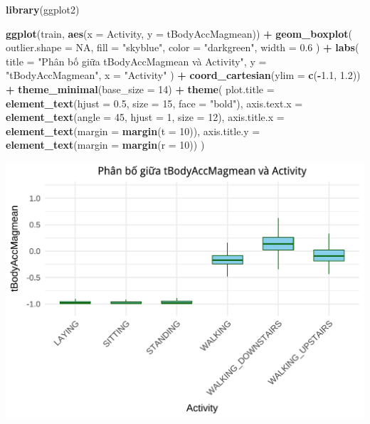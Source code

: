 \documentclass[
]{article}
\newenvironment{Shaded}{\begin{snugshade}}{\end{snugshade}}
\newcommand{\AttributeTok}[1]{\textcolor[rgb]{0.13,0.29,0.53}{#1}}
\newcommand{\ConstantTok}[1]{\textcolor[rgb]{0.56,0.35,0.01}{#1}}
\newcommand{\DecValTok}[1]{\textcolor[rgb]{0.00,0.00,0.81}{#1}}
\newcommand{\FloatTok}[1]{\textcolor[rgb]{0.00,0.00,0.81}{#1}}
\newcommand{\FunctionTok}[1]{\textcolor[rgb]{0.13,0.29,0.53}{\textbf{#1}}}
\newcommand{\NormalTok}[1]{#1}
\newcommand{\SpecialCharTok}[1]{\textcolor[rgb]{0.81,0.36,0.00}{\textbf{#1}}}
\newcommand{\StringTok}[1]{\textcolor[rgb]{0.31,0.60,0.02}{#1}}
\begin{document}
\begin{Shaded}
\begin{Highlighting}[]
\FunctionTok{library}\NormalTok{(ggplot2)}

\FunctionTok{ggplot}\NormalTok{(train, }\FunctionTok{aes}\NormalTok{(}\AttributeTok{x =}\NormalTok{ Activity, }\AttributeTok{y =}\NormalTok{ tBodyAccMagmean)) }\SpecialCharTok{+}
  \FunctionTok{geom\_boxplot}\NormalTok{(}
    \AttributeTok{outlier.shape =} \ConstantTok{NA}\NormalTok{,}
    \AttributeTok{fill =} \StringTok{"skyblue"}\NormalTok{,}
    \AttributeTok{color =} \StringTok{"darkgreen"}\NormalTok{,}
    \AttributeTok{width =} \FloatTok{0.6}
\NormalTok{  ) }\SpecialCharTok{+}
  \FunctionTok{labs}\NormalTok{(}
    \AttributeTok{title =} \StringTok{"Phân bố giữa tBodyAccMagmean và Activity"}\NormalTok{,}
    \AttributeTok{y =} \StringTok{"tBodyAccMagmean"}\NormalTok{,}
    \AttributeTok{x =} \StringTok{"Activity"}
\NormalTok{  ) }\SpecialCharTok{+}
  \FunctionTok{coord\_cartesian}\NormalTok{(}\AttributeTok{ylim =} \FunctionTok{c}\NormalTok{(}\SpecialCharTok{{-}}\FloatTok{1.1}\NormalTok{, }\FloatTok{1.2}\NormalTok{)) }\SpecialCharTok{+} 
  \FunctionTok{theme\_minimal}\NormalTok{(}\AttributeTok{base\_size =} \DecValTok{14}\NormalTok{) }\SpecialCharTok{+}
  \FunctionTok{theme}\NormalTok{(}
    \AttributeTok{plot.title =} \FunctionTok{element\_text}\NormalTok{(}\AttributeTok{hjust =} \FloatTok{0.5}\NormalTok{, }\AttributeTok{size =} \DecValTok{15}\NormalTok{, }\AttributeTok{face =} \StringTok{"bold"}\NormalTok{),}
    \AttributeTok{axis.text.x =} \FunctionTok{element\_text}\NormalTok{(}\AttributeTok{angle =} \DecValTok{45}\NormalTok{, }\AttributeTok{hjust =} \DecValTok{1}\NormalTok{, }\AttributeTok{size =} \DecValTok{12}\NormalTok{),}
    \AttributeTok{axis.title.x =} \FunctionTok{element\_text}\NormalTok{(}\AttributeTok{margin =} \FunctionTok{margin}\NormalTok{(}\AttributeTok{t =} \DecValTok{10}\NormalTok{)),}
    \AttributeTok{axis.title.y =} \FunctionTok{element\_text}\NormalTok{(}\AttributeTok{margin =} \FunctionTok{margin}\NormalTok{(}\AttributeTok{r =} \DecValTok{10}\NormalTok{))}
\NormalTok{  )}
\end{Highlighting}
\end{Shaded}

\includegraphics{report_files/figure-latex/unnamed-chunk-16-1.pdf}
\end{document}
